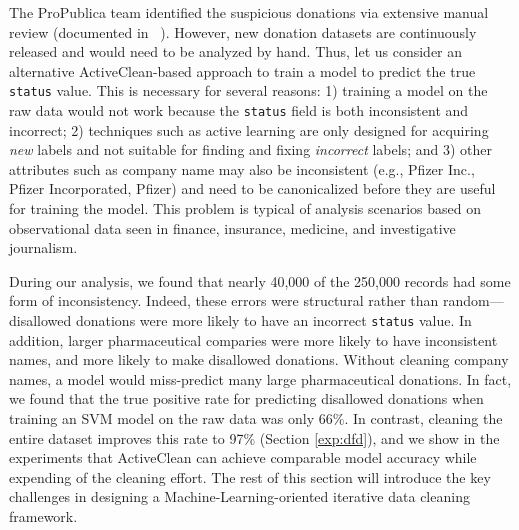 
The ProPublica team identified the suspicious donations via extensive manual review (documented in ~\cite{dollarsfordocs}).
However, new donation datasets are continuously released and would need to be analyzed by hand.
Thus, let us consider an alternative ActiveClean-based approach to train a model to predict the true \texttt{status} value.
This is necessary for several reasons: 1) training a model on the raw data would not work because the \texttt{status} field is both inconsistent and incorrect;
2) techniques such as active learning are only designed for acquiring {\it new} labels and not suitable for finding and fixing {\it incorrect} labels;
and 3) other attributes such as company name may also be inconsistent (e.g., Pfizer Inc., Pfizer Incorporated, Pfizer) and need to be canonicalized before they are useful
for training the model.
This problem is typical of analysis scenarios based on observational data seen in finance, insurance, medicine, and investigative journalism.

During our analysis, we found that nearly 40,000 of the 250,000 records had some form of inconsistency.
Indeed, these errors were structural rather than random---disallowed donations were more likely to have an incorrect \texttt{status} value.
In addition, larger pharmaceutical comparies were more likely to have inconsistent names, and more likely to make disallowed donations.
Without cleaning company names, a model would miss-predict many large pharmaceutical donations.
In fact, we found that the true positive rate for predicting disallowed donations when training an SVM model on the raw data was only 66\%.
In contrast, cleaning the entire dataset improves this rate to 97\% (Section \ref{exp:dfd}), and we show in the experiments that ActiveClean
can achieve comparable model accuracy while expending  of the cleaning effort.
The rest of this section will introduce the key challenges in designing a Machine-Learning-oriented iterative data cleaning framework.



